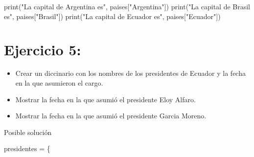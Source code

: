\documentclass[
  a4paper,
  DIV=11,
  numbers=noendperiod,
  onepage,
  openany]{scrreprt}
\newenvironment{Shaded}{\begin{snugshade}}{\end{snugshade}}
\newcommand{\BuiltInTok}[1]{\textcolor[rgb]{0.00,0.23,0.31}{#1}}
\newcommand{\NormalTok}[1]{\textcolor[rgb]{0.00,0.23,0.31}{#1}}
\newcommand{\OperatorTok}[1]{\textcolor[rgb]{0.37,0.37,0.37}{#1}}
\newcommand{\StringTok}[1]{\textcolor[rgb]{0.13,0.47,0.30}{#1}}
\providecommand{\tightlist}{%
  \setlength{\itemsep}{0pt}\setlength{\parskip}{0pt}}\usepackage{longtable,booktabs,array}
\begin{document}
\begin{tcolorbox}
\begin{Shaded}
\begin{Highlighting}[]
\BuiltInTok{print}\NormalTok{(}\StringTok{"La capital de Argentina es"}\NormalTok{, paises[}\StringTok{"Argentina"}\NormalTok{])}
\BuiltInTok{print}\NormalTok{(}\StringTok{"La capital de Brasil es"}\NormalTok{, paises[}\StringTok{"Brasil"}\NormalTok{])}
\BuiltInTok{print}\NormalTok{(}\StringTok{"La capital de Ecuador es"}\NormalTok{, paises[}\StringTok{"Ecuador"}\NormalTok{])}
\end{Highlighting}
\end{Shaded}

\section{Ejercicio 5:}\label{ejercicio-5-4}

\begin{itemize}
\tightlist
\item
  Crear un diccinario con los nombres de los presidentes de Ecuador y la
  fecha en la que asumieron el cargo.
\item
  Mostrar la fecha en la que asumió el presidente Eloy Alfaro.
\item
  Mostrar la fecha en la que asumió el presidente Garcia Moreno.
\end{itemize}

Posible solución

\begin{Shaded}
\begin{Highlighting}[]
\NormalTok{presidentes }\OperatorTok{=}\NormalTok{ \{}


\end{Highlighting}
\end{Shaded}
\end{tcolorbox}
\end{document}
